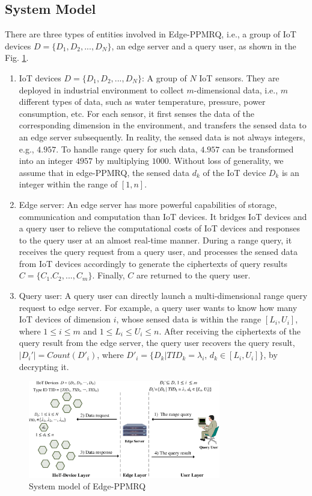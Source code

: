 \documentclass[IEEE JOURNAL OF BIOMEDICAL AND HEALTH INFORMATICS]{IEEEtran}
\begin{document}
\subsection{System Model}
There are three types of entities involved in Edge-PPMRQ, i.e., a group of IoT devices $D=\{D_1, D_2, ... , D_N\}$, an edge server and a query user, as shown in the Fig. \ref{system model}. 
\begin{enumerate}
  \item IoT devices $D=\{D_1, D_2, ... ,D_N\}$: A group of $N$ IoT sensors. They are deployed in industrial environment to collect $m$-dimensional data, i.e., $m$ different types of data, such as water temperature, pressure, power consumption, etc. For each sensor, it first senses the data of the corresponding dimension in the environment, and transfers the sensed data to an edge server subsequently. In reality, the sensed data is not always integers, e.g., $4.957$. To handle range query for such data, $4.957$ can be transformed into an integer $4957$ by multiplying $1000$. Without loss of generality, we assume that in edge-PPMRQ, the sensed data $d_k$ of the IoT device $D_k$ is an integer within the range of $[1, n]$.  
  \item Edge server: An edge server has more powerful capabilities of storage, communication and computation than IoT devices. It bridges IoT devices and a query user to relieve the computational costs of IoT devices and responses to the query user at an almost real-time manner. During a range query, it receives the query request from a query user, and processes the sensed data from IoT devices accordingly to generate the ciphertexts of query results $C=\{C_1.C_2, ..., C_m\}$. Finally, $C$ are returned to the query user. 
  \item Query user: A query user can directly launch a multi-dimensional range query request to edge server. For example, a query user wants to know how many IoT devices of dimension $i$, whose sensed data is within the range $[L_i, U_i]$, where $1 \le i \le m$ and $ 1 \le L_i \le U_i \le n $. After receiving the ciphertexts of the query result from the edge server, the query user recovers the query result, $|D_i'|=Count(D'_i)$, where $D'_i=\{D_k | TID_k=\lambda_i$, $d_k \in [L_i, U_i]\}$,  by decrypting it.
\end{enumerate}

\begin{figure}
  \centering
  \includegraphics[width=3.3in]{system_model}
  \caption{System model of Edge-PPMRQ}\label{system model}
\end{figure}
\end{document}
